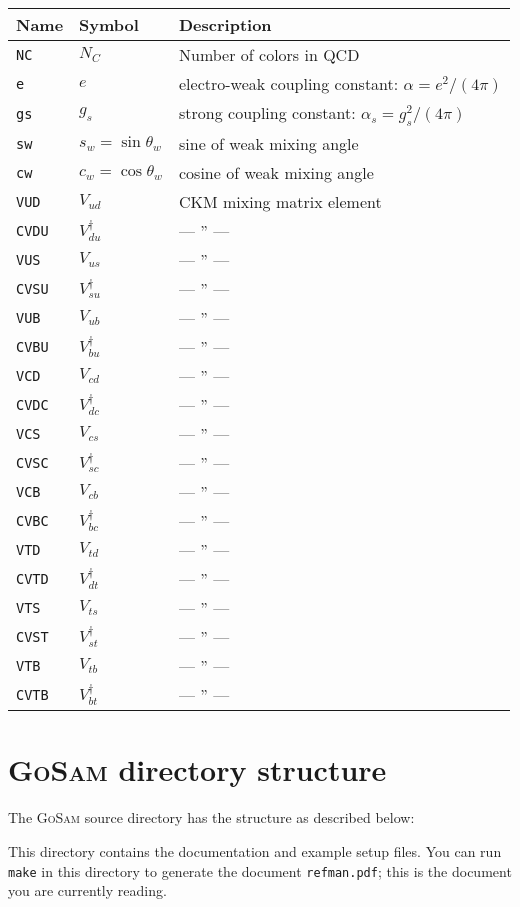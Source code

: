 \documentclass[11pt,a4paper]{refrep}
\newcommand{\gosamversion}{{3{.}0}}
\newcommand{\gosam}{\textsc{GoSam}\xspace}
\newcommand{\gosamv}[1][\gosamversion]{\textsc{GoSam}\xspace}
\begin{document}
\medskip
\begin{tabular}{|l|l|l|}
\hline
Name & Symbol & Description\\
\hline
\tt NC & $N_C$ & Number of colors in QCD\\
\tt e & $e$ & electro-weak coupling constant: $\alpha=e^2/(4\pi)$\\
\tt gs & $g_s$ & strong coupling constant: $\alpha_s=g_s^2/(4\pi)$\\
\tt sw & $s_w=\sin\theta_w$ & sine of weak mixing angle\\
\tt cw & $c_w=\cos\theta_w$ & cosine of weak mixing angle\\
\tt VUD & $V_{ud}$ & CKM mixing matrix element\\
\tt CVDU & $V_{du}^{\dagger}$ & --- '' ---\\
\tt VUS & $V_{us}$ & --- '' ---\\
\tt CVSU & $V_{su}^{\dagger}$ & --- '' ---\\
\tt VUB & $V_{ub}$ & --- '' ---\\
\tt CVBU & $V_{bu}^{\dagger}$ & --- '' ---\\
\tt VCD & $V_{cd}$ & --- '' ---\\
\tt CVDC & $V_{dc}^{\dagger}$ & --- '' ---\\
\tt VCS & $V_{cs}$ & --- '' ---\\
\tt CVSC & $V_{sc}^{\dagger}$ & --- '' ---\\
\tt VCB & $V_{cb}$ & --- '' ---\\
\tt CVBC & $V_{bc}^{\dagger}$ & --- '' ---\\
\tt VTD & $V_{td}$ & --- '' ---\\
\tt CVTD & $V_{dt}^{\dagger}$ & --- '' ---\\
\tt VTS & $V_{ts}$ & --- '' ---\\
\tt CVST & $V_{st}^{\dagger}$ & --- '' ---\\
\tt VTB & $V_{tb}$ & --- '' ---\\
\tt CVTB & $V_{bt}^{\dagger}$ & --- '' ---\\
\hline
\end{tabular}

\section{\gosam{} directory structure}
The \gosamv{} source directory has the structure as described below:

 This directory contains the documentation
and example setup files. You can run \texttt{make} in this directory
to generate the document \texttt{refman.pdf}; this is the document you
are currently reading.
\end{document}
